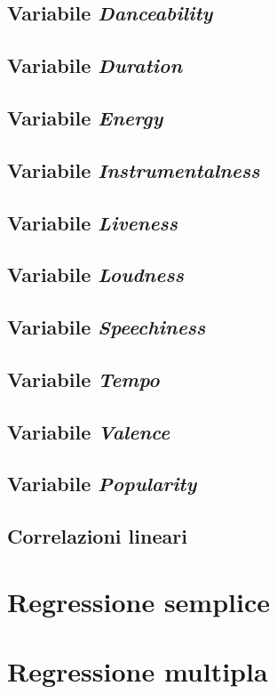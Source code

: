 \documentclass[fleqn,10pt]{SelfArx} %
\begin{document}
\subsection*{Variabile \textit{Danceability}}
\subsection*{Variabile \textit{Duration}}
\subsection*{Variabile \textit{Energy}}
\subsection*{Variabile \textit{Instrumentalness}}
\subsection*{Variabile \textit{Liveness}}
\subsection*{Variabile \textit{Loudness}}
\subsection*{Variabile \textit{Speechiness}}
\subsection*{Variabile \textit{Tempo}}
\subsection*{Variabile \textit{Valence}}
\subsection*{Variabile \textit{Popularity}}
\subsection{Correlazioni lineari}
\section{Regressione semplice}

\section{Regressione multipla}
\end{document}
